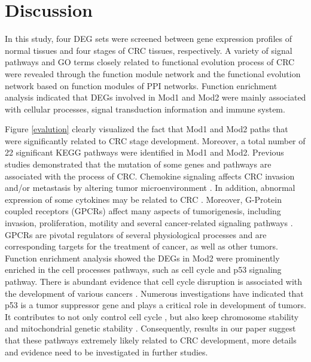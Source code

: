 \documentclass[utf8]{frontiersSCNS} %
\begin{document}
\section{Discussion}

In this study, four DEG sets were
screened between gene expression profiles of normal tissues
and four stages of CRC tissues, respectively. A variety of
signal pathways and GO terms closely related to functional evolution process of CRC were revealed through the function module network and the functional evolution network based on function modules of PPI networks. Function enrichment analysis indicated that DEGs involved in Mod1 and Mod2 were mainly associated with cellular processes, signal transduction information and immune system.

Figure \ref{evalution} clearly visualized the fact that Mod1 and Mod2 paths that were significantly related to CRC stage development. Moreover, a total number of 22 significant KEGG pathways were identified in Mod1 and Mod2. 
Previous studies demonstrated that the mutation of some genes and pathways are associated with the process of CRC.
Chemokine signaling affects CRC invasion and/or metastasis by altering tumor microenvironment \citep{itatani2016role}. In addition, abnormal expression of
some cytokines may be related to CRC \citep{trost2005important}. 
Moreover, G-Protein coupled receptors (GPCRs) affect many aspects of tumorigenesis, including invasion, proliferation, motility and several cancer-related signaling pathways \citep{zhong2001regulator}. GPCRs are pivotal regulators of several physiological processes and are corresponding targets for the treatment of cancer, as well as other tumors. Function enrichment analysis showed the DEGs in Mod2 were prominently enriched in the cell processes pathways, such as cell cycle and p53 signaling pathway. There is abundant evidence that cell cycle disruption is associated with the development of various cancers \citep{maddika2007cell,chang2003involvement}. Numerous investigations have indicated that p53 is
a tumor suppressor gene \citep{suzuki2011recent} and plays a critical role in
development of tumors. It contributes to not only control
cell cycle \citep{suzuki2011recent}, but also keep chromosome stability \citep{achanta2005novel} and
mitochondrial genetic stability \citep{liu2004chromosome,iglesias2012maintenance}. Consequently, results in our paper suggest that these pathways extremely likely related to CRC development, more details and
evidence need to be investigated in further studies.
\end{document}
